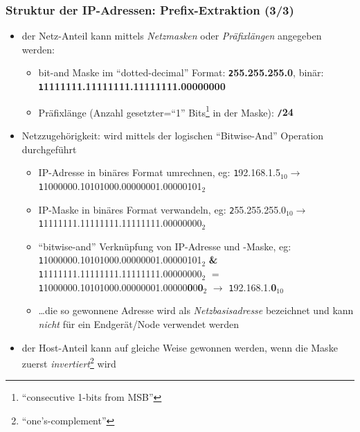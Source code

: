 \documentclass{beamer}
\begin{document}
\begin{frame}
\frametitle{Struktur der IP-Adressen: Prefix-Extraktion (3/3)}
\begin{itemize}
	\item{der Netz-Anteil kann mittels {\em Netzmasken} oder {\em Pr\"afixl\"angen} angegeben werden:}
	\begin{itemize}
	\item{{\tiny bit-and Maske im ``dotted-decimal'' Format: {\textbf {\texttt 255.255.255.0}}, bin\"ar: {\textbf {\texttt 11111111.11111111.11111111.00000000}}}}
	\item{{\tiny Pr\"afixl\"ange (Anzahl gesetzter=``1'' Bits\footnote{``consecutive 1-bits from MSB''} in der Maske): {\textbf {\texttt /24}}}}
\end{itemize}
\item{Netzzugeh\"origkeit: wird mittels der logischen ``Bitwise-And'' Operation durchgef\"uhrt}
\begin{itemize}
	\item{{\tiny IP-Adresse in bin\"ares Format umrechnen, eg: {\texttt 192.168.1.5}$_{10}$$\rightarrow${\texttt 11000000.10101000.00000001.00000101}$_{2}$}}
	\item{{\tiny IP-Maske in bin\"ares Format verwandeln, eg: {\texttt 255.255.255.0}$_{10}$$\rightarrow${\texttt 11111111.11111111.11111111.00000000}$_{2}$}}
	\item{{\tiny ``bitwise-and'' Verkn\"upfung von IP-Adresse und -Maske, eg:\\{\texttt 11000000.10101000.00000001.00000101}$_{2}$ {\textbf \&} {\texttt 11111111.11111111.11111111.00000000}$_{2}$ $=$\\{\texttt 11000000.10101000.00000001.00000{\textbf 0}0{\textbf 0}}$_{2}$ $\rightarrow$ {\texttt 192.168.1.{\textbf 0}}$_{10}$
	}} 
	\item{{\tiny \ldots die so gewonnene Adresse wird als {\em Netzbasisadresse} bezeichnet und kann {\em nicht} f\"ur ein Endger\"at/Node verwendet werden}}
\end{itemize}
\item{der Host-Anteil kann auf gleiche Weise gewonnen werden, wenn die Maske zuerst {\em invertiert}\footnote{``one's-complement''} wird}
\end{itemize}
\end{frame}
\end{document}
